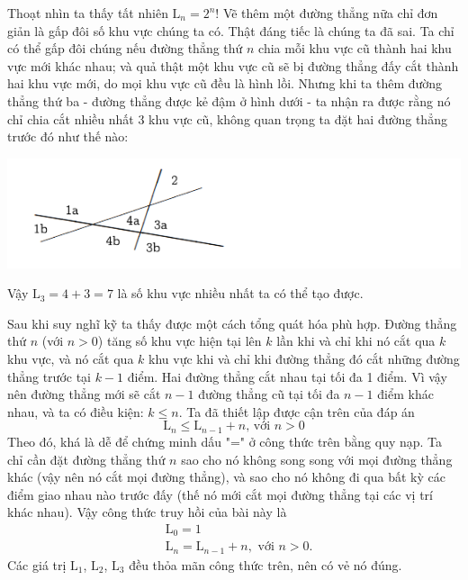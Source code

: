 Thoạt nhìn ta thấy tất nhiên $\mathrm{L}_n = 2^n$! Vẽ thêm một đường thẳng nữa chỉ đơn giản là gấp đôi số khu vực chúng ta có. Thật đáng tiếc là chúng ta đã sai. Ta chỉ có thể gấp đôi chúng nếu đường thẳng thứ $n$ chia mỗi khu vực cũ thành hai khu vực mới khác nhau; và quả thật một khu vực cũ sẽ bị đường thẳng đấy cắt thành hai khu vực mới, do mọi khu vực cũ đều là hình lồi. 
Nhưng khi ta thêm đường thẳng thứ ba - đường thẳng được kẻ đậm ở hình dưới - ta nhận ra được rằng nó chỉ chia cắt nhiều nhất 3 khu vực cũ, không quan trọng ta đặt hai đường thẳng trước đó như thế nào:
\begin{center}
    \includegraphics[width=1\textwidth]{assets/chapter1/split_region.png}
\end{center}
Vậy $\mathrm{L}_3 = 4 + 3 = 7$ là số khu vực nhiều nhất ta có thể tạo được.

Sau khi suy nghĩ kỹ ta thấy được một cách tổng quát hóa phù hợp. Đường thẳng thứ $n$ (với $n > 0$) tăng số khu vực hiện tại lên $k$ lần khi và chỉ khi nó cắt qua $k$ khu vực, và nó cắt qua $k$ khu vực khi và chỉ khi đường thẳng đó cắt những đường thẳng trước tại $k - 1$ điểm. Hai đường thẳng cắt nhau tại tối đa 1 điểm. Vì vậy nên đường thẳng mới sẽ cắt $n - 1$ đường thẳng cũ tại tối đa $n - 1$ điểm khác nhau, và ta có điều kiện: $k \leq n$. Ta đã thiết lập được cận trên của đáp án
$$\mathrm{L}_n \leq \mathrm{L}_{n - 1} + n \text{, \ \ \ \ với } n > 0$$
Theo đó, khá là dễ để chứng minh dấu "=" ở công thức trên bằng quy nạp. Ta chỉ cần đặt đường thẳng thứ $n$ sao cho nó không song song với mọi đường thẳng khác (vậy nên nó cắt mọi đường thẳng), và sao cho nó không đi qua bất kỳ các điểm giao nhau nào trước đấy (thế nó mới cắt mọi đường thẳng tại các vị trí khác nhau). Vậy công thức truy hồi của bài này là
\begin{equation}\label{eq:1.4}
    \begin{aligned}
        & \mathrm{L}_0 = 1 \\
        & \mathrm{L}_n = \mathrm{L}_{n - 1} + n, \text{ \ \ \ \ với } n > 0.
    \end{aligned}
\end{equation}
Các giá trị $\mathrm{L}_1$, $\mathrm{L}_2$, $\mathrm{L}_3$ đều thỏa mãn công thức trên, nên có vẻ nó đúng.

